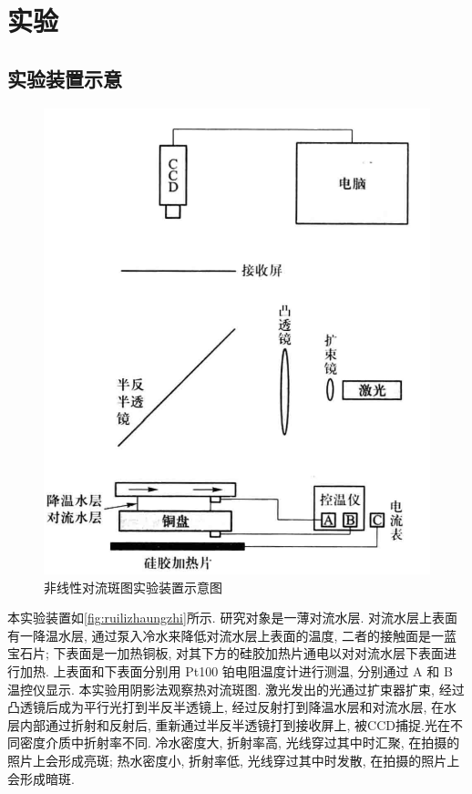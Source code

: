\documentclass[font=default]{mpltx}
\begin{document}
\section{实验}
\subsection{实验装置示意}

\begin{figure}[htbp]
  \centering
  \includegraphics[width=0.85\linewidth]{fig/ruilizhaungzhi.png}
  \caption{非线性对流斑图实验装置示意图
    }
  \label{fig:ruilizhaungzhi}
\end{figure}

  本实验装置如\autoref{fig:ruilizhaungzhi}所示. 研究对象是一薄对流水层. 对流水层上表面有一降温水层, 通过泵入冷水来降低对流水层上表面的温度, 二者的接触面是一蓝宝石片; 
  下表面是一加热铜板, 对其下方的硅胶加热片通电以对对流水层下表面进行加热. 上表面和下表面分别用 Pt100 铂电阻温度计进行测温, 分别通过 A 和 B 温控仪显示. 
  本实验用阴影法观察热对流斑图. 激光发出的光通过扩束器扩束, 经过凸透镜后成为平行光打到半反半透镜上, 经过反射打到降温水层和对流水层, 在水层内部通过折射和反射后,
  重新通过半反半透镜打到接收屏上, 被CCD捕捉.光在不同密度介质中折射率不同. 冷水密度大, 折射率高, 光线穿过其中时汇聚, 在拍摄的照片上会形成亮斑; 热水密度小, 折射率低, 光线穿过其中时发散, 在拍摄的照片上会形成暗斑.
  \par
\end{document}
